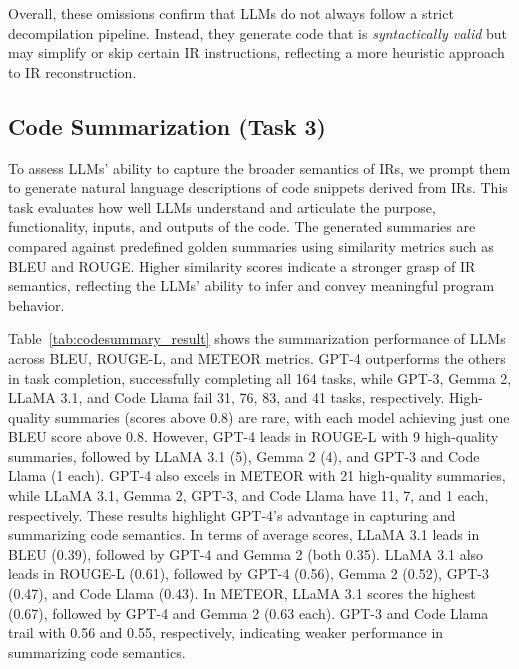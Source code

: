 Overall, these omissions confirm that LLMs do not always follow a strict decompilation pipeline. Instead, they generate code that is \emph{syntactically valid} but may simplify or skip certain IR instructions, reflecting a more heuristic approach to IR reconstruction.


\subsection{Code Summarization (Task 3)}
\label{subsec:code_summarization_result}

To assess LLMs' ability to capture the broader semantics of IRs, we prompt them to generate natural language descriptions of code snippets derived from IRs. This task evaluates how well LLMs understand and articulate the purpose, functionality, inputs, and outputs of the code. The generated summaries are compared against predefined golden summaries using similarity metrics such as BLEU and ROUGE. Higher similarity scores indicate a stronger grasp of IR semantics, reflecting the LLMs' ability to infer and convey meaningful program behavior.

Table~\ref{tab:codesummary_result} shows the summarization performance of LLMs across BLEU, ROUGE-L, and METEOR metrics. GPT-4 outperforms the others in task completion, successfully completing all 164 tasks, while GPT-3, Gemma 2, LLaMA 3.1, and Code Llama fail 31, 76, 83, and 41 tasks, respectively. High-quality summaries (scores above 0.8) are rare, with each model achieving just one BLEU score above 0.8. However, GPT-4 leads in ROUGE-L with 9 high-quality summaries, followed by LLaMA 3.1 (5), Gemma 2 (4), and GPT-3 and Code Llama (1 each). GPT-4 also excels in METEOR with 21 high-quality summaries, while LLaMA 3.1, Gemma 2, GPT-3, and Code Llama have 11, 7, and 1 each, respectively. These results highlight GPT-4’s advantage in capturing and summarizing code semantics.
In terms of average scores, LLaMA 3.1 leads in BLEU (0.39), followed by GPT-4 and Gemma 2 (both 0.35). LLaMA 3.1 also leads in ROUGE-L (0.61), followed by GPT-4 (0.56), Gemma 2 (0.52), GPT-3 (0.47), and Code Llama (0.43). In METEOR, LLaMA 3.1 scores the highest (0.67), followed by GPT-4 and Gemma 2 (0.63 each). GPT-3 and Code Llama trail with 0.56 and 0.55, respectively, indicating weaker performance in summarizing code semantics.



